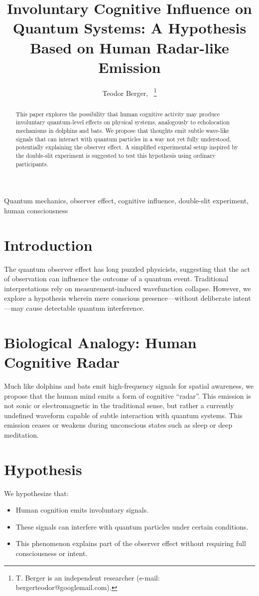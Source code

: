 \documentclass[12pt]{IEEEtran}
\title{Involuntary Cognitive Influence on Quantum Systems: A Hypothesis Based on Human Radar-like Emission}
\author{Teodor Berger,~\IEEEmembership{Independent Researcher}%
\thanks{T. Berger is an independent researcher (e-mail: bergerteodor@googlemail.com).}}
\begin{document}
\maketitle

\begin{abstract}
This paper explores the possibility that human cognitive activity may produce involuntary quantum-level effects on physical systems, analogously to echolocation mechanisms in dolphins and bats. We propose that thoughts emit subtle wave-like signals that can interact with quantum particles in a way not yet fully understood, potentially explaining the observer effect. A simplified experimental setup inspired by the double-slit experiment is suggested to test this hypothesis using ordinary participants.
\end{abstract}

\begin{IEEEkeywords}
Quantum mechanics, observer effect, cognitive influence, double-slit experiment, human consciousness
\end{IEEEkeywords}

\section{Introduction}
The quantum observer effect has long puzzled physicists, suggesting that the act of observation can influence the outcome of a quantum event. Traditional interpretations rely on measurement-induced wavefunction collapse. However, we explore a hypothesis wherein mere conscious presence---without deliberate intent---may cause detectable quantum interference.

\section{Biological Analogy: Human Cognitive Radar}
Much like dolphins and bats emit high-frequency signals for spatial awareness, we propose that the human mind emits a form of cognitive ``radar''. This emission is not sonic or electromagnetic in the traditional sense, but rather a currently undefined waveform capable of subtle interaction with quantum systems. This emission ceases or weakens during unconscious states such as sleep or deep meditation.

\section{Hypothesis}
We hypothesize that:
\begin{itemize}
    \item Human cognition emits involuntary signals.
    \item These signals can interfere with quantum particles under certain conditions.
    \item This phenomenon explains part of the observer effect without requiring full consciousness or intent.
\end{itemize}
\end{document}
